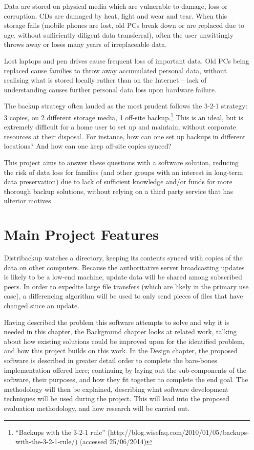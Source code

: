 \documentclass[12pt,a4paper,]{adreport}
\begin{document}
Data are stored on physical media which are vulnerable to damage, loss
or corruption. CDs are damaged by heat, light and wear and tear. When
this storage fails (mobile phones are lost, old PCs break down or are
replaced due to age, without sufficiently diligent data transferral),
often the user unwittingly throws away or loses many years of
irreplaceable data.

Lost laptops and pen drives cause frequent loss of important data. Old
PCs being replaced cause families to throw away accumulated personal
data, without realising what is stored locally rather than on the
Internet -- lack of understanding causes further personal data loss upon
hardware failure.

The backup strategy often lauded as the most prudent follows the 3-2-1
strategy: 3 copies, on 2 different storage media, 1 off-site
backup.\footnote{``Backups with the 3-2-1 rule''
  (http://blog.wisefaq.com/2010/01/05/backups-with-the-3-2-1-rule/)
  (accessed 25/06/2014)} This is an ideal, but is extremely difficult
for a home user to set up and maintain, without corporate resources at
their disposal. For instance, how can one set up backups in different
locations? And how can one keep off-site copies synced?

This project aims to answer these questions with a software solution,
reducing the risk of data loss for families (and other groups with an
interest in long-term data preservation) due to lack of sufficient
knowledge and/or funds for more thorough backup solutions, without
relying on a third party service that has ulterior motives.

\section{Main Project Features}\label{main-project-features}

Distribackup watches a directory, keeping its contents synced with
copies of the data on other computers. Because the authoritative server
broadcasting updates is likely to be a low-end machine, update data will
be shared among subscribed peers. In order to expedite large file
transfers (which are likely in the primary use case), a differencing
algorithm will be used to only send pieces of files that have changed
since an update.

Having described the problem this software attempts to solve and why it
is needed in this chapter, the Background chapter looks at related work,
talking about how existing solutions could be improved upon for the
identified problem, and how this project builds on this work. In the
Design chapter, the proposed software is described in greater detail
order to complete the bare-bones implementation offered here; continuing
by laying out the sub-components of the software, their purposes, and
how they fit together to complete the end goal. The methodology will
then be explained, describing what software development techniques will
be used during the project. This will lead into the proposed evaluation
methodology, and how research will be carried out.
\end{document}
